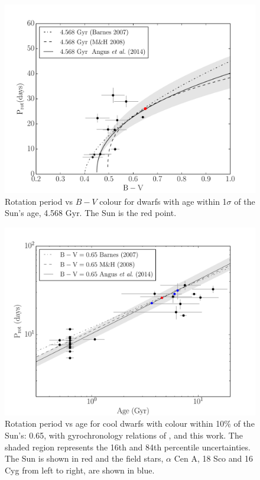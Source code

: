 \documentclass[11pt,preprint]{aastex}
\begin{document}
\begin{figure}[ht]
\begin{center}
\includegraphics[width=6in, clip=true, trim=0 0 0.5in 0]{p_vs_bv_solar.pdf}
\caption{Rotation period vs $B-V$ colour for dwarfs with age within 1$\sigma$ of the Sun's age, 4.568 Gyr. The Sun is the red point.
\label{fig:p_vs_bv_solar}}
\end{center}
\end{figure}

\begin{figure}[ht]
\begin{center}
\includegraphics[width=6in, clip=true, trim=0 0 0.5in 0]{p_vs_a_solar.pdf}
\caption{Rotation period vs age for cool dwarfs with colour within 10\% of the Sun's: 0.65, with gyrochronology relations of \citet{Barnes2007}, \citet{Mamajek2008} and this work. The shaded region represents the 16th and 84th percentile uncertainties. The Sun is shown in red and the field stars, $\alpha$ Cen A, 18 Sco and 16 Cyg from left to right, are shown in blue.
\label{fig:p_vs_a_solar}}
\end{center}
\end{figure}
\end{document}
